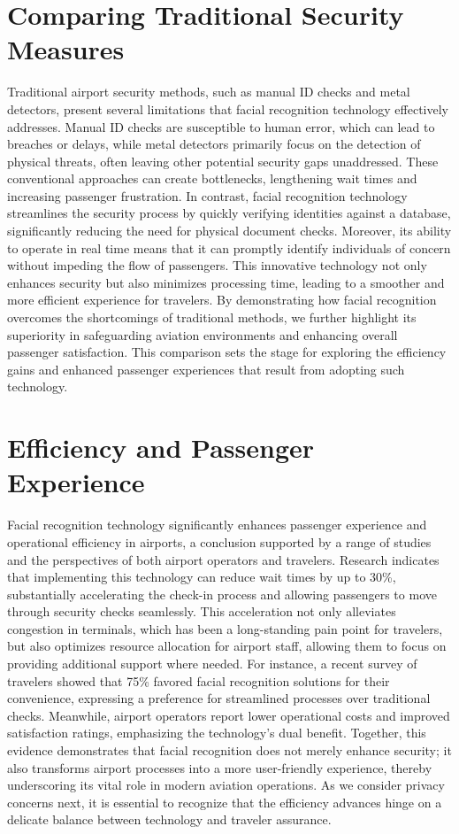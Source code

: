 \documentclass{article}%
\begin{document}
%
\section*{Comparing Traditional Security Measures}%
\label{sec:ComparingTraditionalSecurityMeasures}%
Traditional airport security methods, such as manual ID checks and metal detectors, present several limitations that facial recognition technology effectively addresses. Manual ID checks are susceptible to human error, which can lead to breaches or delays, while metal detectors primarily focus on the detection of physical threats, often leaving other potential security gaps unaddressed. These conventional approaches can create bottlenecks, lengthening wait times and increasing passenger frustration. In contrast, facial recognition technology streamlines the security process by quickly verifying identities against a database, significantly reducing the need for physical document checks. Moreover, its ability to operate in real time means that it can promptly identify individuals of concern without impeding the flow of passengers. This innovative technology not only enhances security but also minimizes processing time, leading to a smoother and more efficient experience for travelers. By demonstrating how facial recognition overcomes the shortcomings of traditional methods, we further highlight its superiority in safeguarding aviation environments and enhancing overall passenger satisfaction. This comparison sets the stage for exploring the efficiency gains and enhanced passenger experiences that result from adopting such technology.

%
\section*{Efficiency and Passenger Experience}%
\label{sec:EfficiencyandPassengerExperience}%
Facial recognition technology significantly enhances passenger experience and operational efficiency in airports, a conclusion supported by a range of studies and the perspectives of both airport operators and travelers. Research indicates that implementing this technology can reduce wait times by up to 30\%, substantially accelerating the check{-}in process and allowing passengers to move through security checks seamlessly. This acceleration not only alleviates congestion in terminals, which has been a long{-}standing pain point for travelers, but also optimizes resource allocation for airport staff, allowing them to focus on providing additional support where needed. For instance, a recent survey of travelers showed that 75\% favored facial recognition solutions for their convenience, expressing a preference for streamlined processes over traditional checks. Meanwhile, airport operators report lower operational costs and improved satisfaction ratings, emphasizing the technology's dual benefit. Together, this evidence demonstrates that facial recognition does not merely enhance security; it also transforms airport processes into a more user{-}friendly experience, thereby underscoring its vital role in modern aviation operations. As we consider privacy concerns next, it is essential to recognize that the efficiency advances hinge on a delicate balance between technology and traveler assurance.
\end{document}
